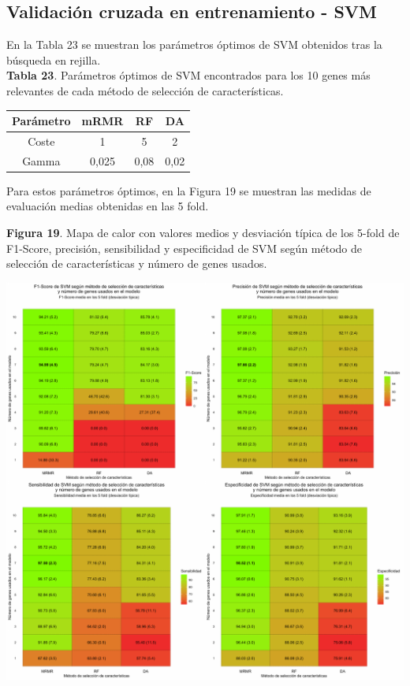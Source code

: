 \subsection{Validación cruzada en entrenamiento - SVM}

En la Tabla 23 se muestran los parámetros óptimos de SVM obtenidos tras la búsqueda en rejilla.\\

\textbf{Tabla 23}. Parámetros óptimos de SVM encontrados para los 10 genes más relevantes de cada método de selección de características.

\begin{table}[H]
	\centering
	\begin{tabular}{cccc}
		\hline
		\textbf{Parámetro} & \textbf{mRMR} & \textbf{RF} & \textbf{DA} \\ \hline
		Coste                &    1 &    5     &   2       \\
		Gamma               &     0,025    &     0,08   & 0,02        \\ \hline
	\end{tabular}
\end{table}

Para estos parámetros óptimos, en la Figura 19 se muestran las medidas de evaluación medias obtenidas en las 5 fold.\\

\newpage
\begin{center}
\textbf{Figura 19}. Mapa de calor con valores medios y desviación típica de los 5-fold de F1-Score, precisión, sensibilidad y especificidad de SVM según método de selección de características y número de genes usados.
\end{center}
\begin{center}
	\includegraphics[width=1\textwidth]{figuras/19_higado_multiclase_heatmap_svm.pdf} 
\end{center}

